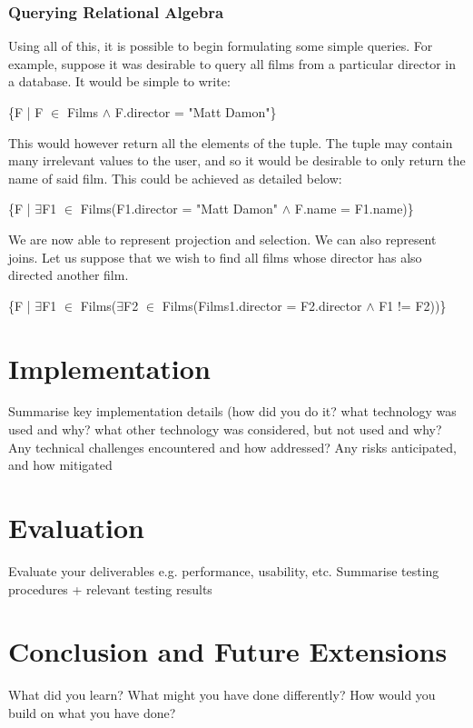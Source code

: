 \documentclass[a4wide, 11pt]{article}
\begin{document}
\subsubsection{Querying Relational Algebra}

Using all of this, it is possible to begin formulating some simple queries. For
example, suppose it was desirable to query all films from a particular director in
a database. It would be simple to write:

\{F | F $\in$ Films $\land$ F.director = "Matt Damon"\}

This would however return all the elements of the tuple. The tuple may contain
many irrelevant values to the user, and so it would be desirable to only return
the name of said film. This could be achieved as detailed below:

\{F | $\exists$F1 $\in$ Films(F1.director = "Matt Damon" $\land$ F.name =
F1.name)\}

We are now able to represent projection and selection. We can also represent
joins. Let us suppose that we wish to find all films whose director has also
directed another film.

\{F | $\exists$F1 $\in$ Films($\exists$F2 $\in$ Films(Films1.director =
F2.director $\land$ F1 != F2))\}


\section{Implementation}

        Summarise key implementation details (how did you do it? what technology was used and why? what other technology was considered, but not used and why?
        Any technical challenges encountered and how addressed?
        Any risks anticipated, and how mitigated 

\section{Evaluation}

        Evaluate your deliverables e.g. performance, usability, etc.
        Summarise testing procedures + relevant testing results 

\section{Conclusion and Future Extensions}

        What did you learn? What might you have done differently?
        How would you build on what you have done? 
\end{document}

